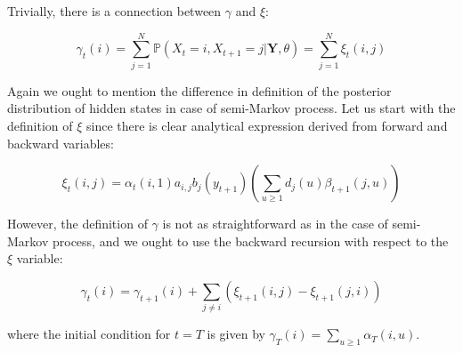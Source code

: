 \noindent Trivially, there is a connection between $\gamma$ and $\xi$:

\begin{equation}
    \gamma_t(i) = \sum_{j=1}^N \mathbb{P}(X_t=i, X_{t+1}=j|\textbf{Y},\theta) = \sum_{j=1}^N \xi_t(i,j)
\end{equation}

Again we ought to mention the difference in definition of the posterior distribution of hidden states in case of semi-Markov process. Let us start with the definition of $\xi$ since
there is clear analytical expression derived from forward and backward variables:

\begin{equation}
    \xi_t(i,j) = \alpha_{t}(i,1) a_{i,j} b_j(y_{t+1}) \left( \sum\limits_{u \geq 1} d_j(u) \beta_{t+1}(j,u) \right)
\end{equation}

\noindent However, the definition of $\gamma$ is not as straightforward as in the case of semi-Markov process, and we ought to use the backward recursion with respect to the $\xi$ variable:

\begin{equation}
    \gamma_t(i) = \gamma_{t+1}(i) + \sum\limits_{j \neq i} \left( \xi_{t+1}(i,j) - \xi_{t+1}(j,i)\right)
\end{equation}

where the initial condition for $t=T$ is given by $\gamma_T(i) = \sum\limits_{u \geq 1} \alpha_T(i,u)$.

